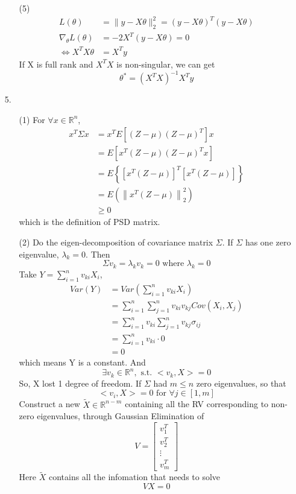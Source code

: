 \documentclass[a4paper,12pt]{article}
\begin{document}
\begin{enumerate}
\begin{itemize}
\clearpage
\item[(5)]
\begin{align*}
L(\theta) &= \| y - X\theta\|_2^2 = (y-X\theta)^T(y-X\theta) \\
\nabla_\theta L(\theta) &= -2X^T (y-X\theta) = 0 \\
\Longleftrightarrow X^T X \theta &= X^T y
\end{align*}
If X is full rank and $X^T X$ is non-singular, we can get
$$
\theta^* = (X^T X)^{-1} X^T y
$$
\end{itemize}

\clearpage
\item[5.]
\begin{itemize}
\item[(1)]
For $\forall x \in \mathbb{R}^n$,
\begin{align*}
x^T \Sigma x 
&= x^T E \left [ (Z - \mu)(Z - \mu)^T \right ] x \\
&= E \left [ x^T (Z - \mu)(Z - \mu)^T x \right ] \\
&= E \left \{ \left [ x^T (Z - \mu)\right ]^T \left [ x^T(Z - \mu) \right ] \right \} \\
&= E \left ( \left \|x^T (Z - \mu) \right \|_2^2\right ) \\
&\ge 0
\end{align*}
which is the definition of PSD matrix.

\clearpage
\item[(2)]
Do the eigen-decomposition of covariance matrix $\Sigma$. If  $\Sigma$ has one zero eigenvalue, $\lambda_k = 0$. Then
$$
\Sigma v_k = \lambda_k v_k = 0 \text{  where } \lambda_k = 0
$$
Take $Y = \sum_{i=1}^n v_{ki} X_i$,
\begin{align*}
Var(Y) &= Var(\sum_{i=1}^n v_{ki}X_i) \\
	     &= \sum_{i=1}^n \sum_{j=1}^n v_{ki} v_{kj} Cov(X_i, X_j) \\
	     &= \sum_{i=1}^n v_{ki} \sum_{j=1}^n v_{kj} \sigma_{ij} \\
	     &= \sum_{i=1}^n v_{ki} \cdot 0 \\
	     &= 0
\end{align*}
which means Y is a constant. And 
$$
\exists v_k \in \mathbb{R}^n,\text{  s.t. } <v_k, X> = 0
$$
So, X lost 1 degree of freedom. If $\Sigma$ had $m \le n$ zero eigenvalues, so that
$$
<v_i,X> = 0 \text{ for } \forall j \in [1,m]
$$
Construct a new $\tilde X \in  \mathbb{R}^{n-m}$ containing all the RV corresponding to non-zero eigenvalues, through Gaussian Elimination of
$$
V = \left [
\begin{array}{c}
v_1^T \\ 
v_2^T \\
\vdots \\
v_m^T
\end{array} \right ]
$$
Here $\tilde X$ contains all the infomation that needs to solve
$$
VX = 0
$$
\end{itemize}
\end{enumerate}
\end{document}

